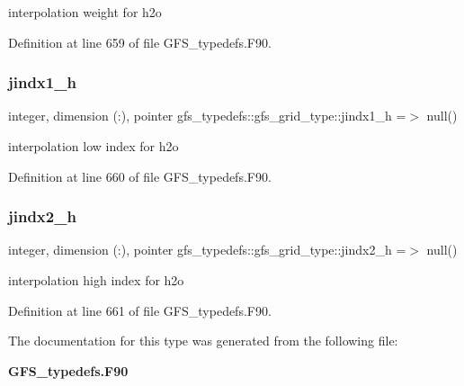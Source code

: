 interpolation weight for h2o 



Definition at line 659 of file G\+F\+S\+\_\+typedefs.\+F90.

\mbox{\label{structgfs__typedefs_1_1gfs__grid__type_a907d528c2a3984106e300c44ebfdfc21}} 
\subsubsection{jindx1\+\_\+h}
{\footnotesize\ttfamily integer, dimension  (\+:), pointer gfs\+\_\+typedefs\+::gfs\+\_\+grid\+\_\+type\+::jindx1\+\_\+h =$>$ null()}



interpolation low index for h2o 



Definition at line 660 of file G\+F\+S\+\_\+typedefs.\+F90.

\mbox{\label{structgfs__typedefs_1_1gfs__grid__type_a794e35867cbff8496e059ef8981352a1}} 
\subsubsection{jindx2\+\_\+h}
{\footnotesize\ttfamily integer, dimension  (\+:), pointer gfs\+\_\+typedefs\+::gfs\+\_\+grid\+\_\+type\+::jindx2\+\_\+h =$>$ null()}



interpolation high index for h2o 



Definition at line 661 of file G\+F\+S\+\_\+typedefs.\+F90.



The documentation for this type was generated from the following file\+:\begin{DoxyCompactItemize}
\item 
\textbf{ G\+F\+S\+\_\+typedefs.\+F90}\end{DoxyCompactItemize}

